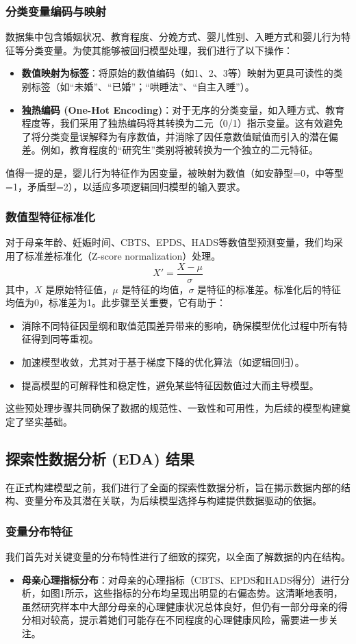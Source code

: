 \documentclass[withoutpreface,bwprint]{cumcmthesis}
\begin{document}
\subsubsection{分类变量编码与映射}
数据集中包含婚姻状况、教育程度、分娩方式、婴儿性别、入睡方式和婴儿行为特征等分类变量。为使其能够被回归模型处理，我们进行了以下操作：
\begin{itemize}
    \item \textbf{数值映射为标签}：将原始的数值编码（如1、2、3等）映射为更具可读性的类别标签（如“未婚”、“已婚”；“哄睡法”、“自主入睡”）。
    \item \textbf{独热编码 (One-Hot Encoding)}：对于无序的分类变量，如入睡方式、教育程度等，我们采用了独热编码将其转换为二元（0/1）指示变量。这有效避免了将分类变量误解释为有序数值，并消除了因任意数值赋值而引入的潜在偏差。例如，教育程度的“研究生”类别将被转换为一个独立的二元特征。
\end{itemize}
值得一提的是，婴儿行为特征作为因变量，被映射为数值（如安静型=0，中等型=1，矛盾型=2），以适应多项逻辑回归模型的输入要求。

\subsubsection{数值型特征标准化}
对于母亲年龄、妊娠时间、CBTS、EPDS、HADS等数值型预测变量，我们均采用了标准差标准化（Z-score normalization）处理。
$$ X' = \frac{X - \mu}{\sigma} $$
其中，$X$ 是原始特征值，$\mu$ 是特征的均值，$\sigma$ 是特征的标准差。标准化后的特征均值为0，标准差为1。此步骤至关重要，它有助于：
\begin{itemize}
    \item 消除不同特征因量纲和取值范围差异带来的影响，确保模型优化过程中所有特征得到同等重视。
    \item 加速模型收敛，尤其对于基于梯度下降的优化算法（如逻辑回归）。
    \item 提高模型的可解释性和稳定性，避免某些特征因数值过大而主导模型。
\end{itemize}
这些预处理步骤共同确保了数据的规范性、一致性和可用性，为后续的模型构建奠定了坚实基础。

\subsection{探索性数据分析 (EDA) 结果}
在正式构建模型之前，我们进行了全面的探索性数据分析，旨在揭示数据内部的结构、变量分布及其潜在关联，为后续模型选择与构建提供数据驱动的依据。

\subsubsection{变量分布特征}
我们首先对关键变量的分布特性进行了细致的探究，以全面了解数据的内在结构。
\begin{itemize}
    \item \textbf{母亲心理指标分布}：对母亲的心理指标（CBTS、EPDS和HADS得分）进行分析，如图1所示，这些指标的分布均呈现出明显的右偏态势。这清晰地表明，虽然研究样本中大部分母亲的心理健康状况总体良好，但仍有一部分母亲的得分相对较高，提示着她们可能存在不同程度的心理健康风险，需要进一步关注。
\end{itemize}
\end{document}
